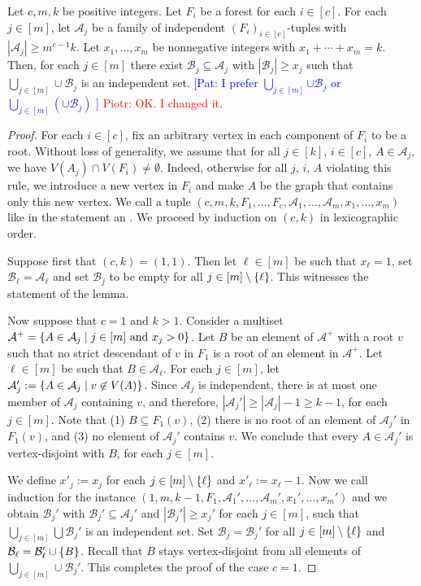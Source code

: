 \documentclass{patmorin}
\newcommand{\pat}[1]{\textcolor{Blue}{[Pat: #1]}}
\newcommand{\piotr}[1]{\textcolor{red}{Piotr: #1}}
\DeclarePairedDelimiter\set{\{}{\}}
\begin{document}
\begin{lem}
Let $c,m,k$ be positive integers. 
Let $F_i$ be a forest for each $i\in[c]$.
For each $j\in [m]$, 
let $\mathcal{A}_j$ be a family of independent $(F_i)_{i\in[c]}$-tuples with $|\mathcal{A}_j|\geq m^{c-1}k$. 
Let $x_1,\ldots,x_m$ be nonnegative integers with $x_1+\cdots+x_m=k$. 
Then, for each $j\in[m]$ there exist
$\mathcal{B}_j \subseteq \mathcal{A}_j$  
with $|\mathcal{B}_j|\geq x_j$ such that 
$\bigcup_{j\in[m]}\cup \mathcal{B}_j$ is an independent set. \pat{I prefer $\bigcup_{j\in[m]}{\cup \mathcal{B}_j}$ or $\bigcup_{j\in[m]}({\cup \mathcal{B}_j})$  }
\piotr{OK. I changed it.}
\end{lem}
\begin{proof}
For each $i\in[c]$, fix an arbitrary vertex in each component of $F_i$ to be a root. 
Without loss of generality, 
we assume that for all $j\in[k]$, $i\in[c]$, $A\in\mathcal{A}_j$, 
we have $V(A_j)\cap V(F_i)\neq\emptyset$. 
Indeed, otherwise for all $j$, $i$, $A$ violating this rule, we introduce a new vertex in $F_i$ and make $A$ be the graph that contains only this new vertex.
We call a tuple $(c,m,k,F_1,\ldots,F_c,\mathcal{A}_1,\ldots,\mathcal{A}_m,x_1,\ldots,x_m)$ like in the statement an .
We proceed by induction on $(c,k)$ in lexicographic order. 

Suppose first that $(c,k)=(1,1)$. 
Then let $\ell\in[m]$ be such that $x_\ell=1$,
set $\mathcal{B}_{\ell}=\mathcal{A}_{\ell}$ and set $\mathcal{B}_j$ to be empty for all $j\in[m]\setminus\set{\ell}$.
This witnesses the statement of the lemma.

Now suppose that $c=1$ and $k>1$.
Consider a multiset $\mathcal{A}^+=\set{A\in \mathcal{A}_j\mid j\in[m] \textrm{ and $x_j>0$}}$. 
Let $B$ be an element of $\mathcal{A}^+$ with a root $v$ such that no strict descendant of $v$ in $F_1$ is a root of an element in $\mathcal{A}^+$.
Let $\ell\in[m]$ be such that $B\in\mathcal{A}_{\ell}$.
For each $j\in[m]$, 
let $\mathcal{A}_j':=\set{A\in\mathcal{A}_j\mid v\not\in V(A)}$. 
Since $\mathcal{A}_j$ is independent, there is at most one member of $\mathcal{A}_j$ containing $v$, 
and therefore, $|\mathcal{A}_j'|\geq |\mathcal{A}_j|-1\geq k-1$, for each $j\in[m]$. 
Note that 
(1) $B\subseteq F_1(v)$,
(2) there is no root of an element of  $\mathcal{A}_j'$ in $F_1(v)$, and 
(3) no element of $\mathcal{A}_j'$ contains $v$. 
We conclude that every $A\in\mathcal{A}_j'$ is vertex-disjoint with $B$, for each $j\in[m]$.

We define 
$x'_j:=x_j$ for each $j\in[m]\setminus\set{\ell}$ and $x'_\ell:=x_{\ell}-1$. 
Now we call induction for the instance 
$(1,m,k-1,F_1,\mathcal{A}_1',\ldots,\mathcal{A}_m',x_1',\ldots,x_m')$ and 
we obtain $\mathcal{B}_j'$ with 
$\mathcal{B}_j'\subseteq \mathcal{A}_j'$ and $|\mathcal{B}_j'|\geq x_j'$ for each $j\in [m]$, 
such that $\bigcup_{j\in[m]}\bigcup\mathcal{B}_j'$ is an independent set.
Set $\mathcal{B}_j=\mathcal{B}_j'$ for all $j\in[m]\setminus\set{\ell}$ and $\mathcal{B}_\ell=\mathcal{B}_\ell'\cup\set{B}$.
Recall that $B$ stays vertex-disjoint from all elements of $\bigcup_{j\in[m]}\cup\mathcal{B}_j'$.  
This completes the proof of the case $c=1$.


\end{proof}
\end{document}
